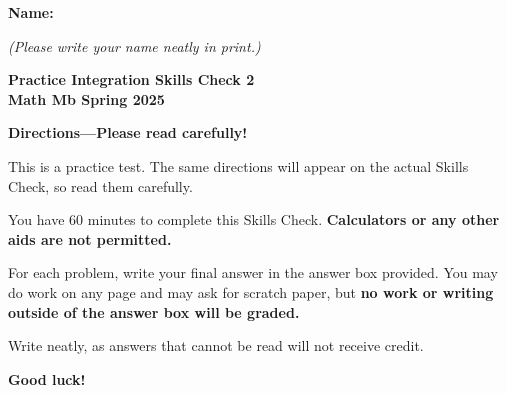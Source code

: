 \documentclass{article}
\begin{document}
 

 \noindent
{\large \mbox{} \hfill \bf Name:\underline{\hspace{2.8in}}}

 {\mbox{} \hfill \it (Please write your name neatly in print.)}


 
\medskip
 
\noindent
{\large\bf
Practice Integration Skills Check 2 \\ Math Mb Spring 2025}
\noindent

{\Large
\begin{center}\textbf{Directions---Please read carefully!} \end{center}}

This is a practice test. The same directions will appear on the actual Skills Check, so read them carefully.

\hrulefill 

You have 60 minutes to complete this Skills Check. \textbf{Calculators or any other aids are not permitted.}  


For each problem, write your final answer in the answer box provided. You may do work on any page and may ask for scratch paper, but \textbf{no work or writing outside of the answer box will be graded.}

Write neatly, as answers that cannot be read will not receive credit. 

   

\begin{center}\textbf{Good luck!}\end{center}
\end{document}
